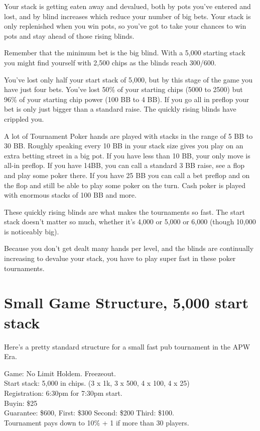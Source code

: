 Your stack is getting eaten away and devalued, both by pots you've entered
and lost, and by blind increases which reduce your number of big bets.
Your stack is only replenished when you win pots, so you've
got to take your chances to win pots and stay ahead of those rising
blinds.

Remember that the minimum bet is the big blind. With a 5,000 starting
stack you might find yourself with 2,500 chips as the blinds reach
300/600.

You've lost only half your start stack of 5,000, but by this
stage of the game you have just four bets. You've lost 50\% of your
starting chips (5000 to 2500) but 96\% of your starting chip power
(100 BB to 4 BB). If you go all in preflop your bet is only just
bigger than a standard raise. The quickly rising blinds have crippled
you.

A lot of Tournament Poker hands are played with stacks in the range of
5 BB to 30 BB. Roughly speaking every 10 BB in your stack size gives you
play on an extra betting street in a big pot. If you have less than
10 BB, your only move is all-in preflop. If you have 14BB, you can call
a standard 3 BB raise, see a flop and play some poker there. If you
have 25 BB you can call a bet preflop and on the flop and still be
able to play some poker on the turn. Cash poker is played with
enormous stacks of 100 BB and more.

These quickly rising blinds are what makes the tournaments so fast.
The start stack doesn't matter so much, whether it's 4,000 or 5,000
or 6,000 (though 10,000 is noticeably big).

Because you don't get dealt many hands per level, and the blinds are
continually increasing to devalue your stack, you have to play super fast
in these poker tournaments.

\section{Small Game Structure, 5,000 start stack}

Here's a pretty standard structure for a small fast pub tournament
in the APW Era.

Game: No Limit Holdem. Freezeout. \\
Start stack: 5,000 in chips. (3 x 1k, 3 x 500, 4 x 100, 4 x 25) \\
Registration: 6:30pm for 7:30pm start. \\
Buyin: \$25 \\
Guarantee: \$600, First: \$300 Second: \$200 Third: \$100. \\
Tournament pays down to 10\% + 1 if more than 30 players.

